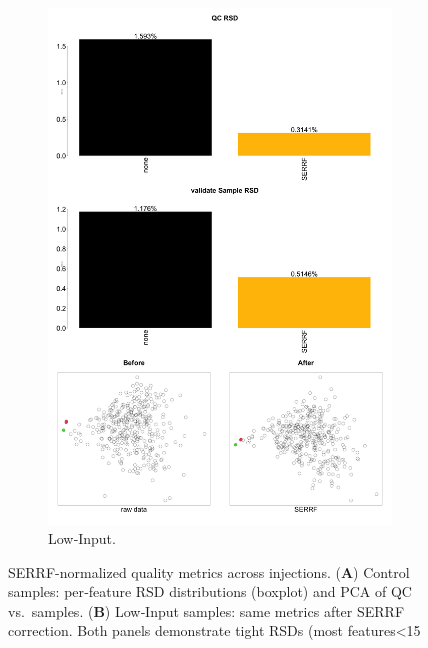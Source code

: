 \documentclass[10pt,letterpaper]{article}
\begin{document}
\begin{figure}[htp]
\begin{subfigure}[t]{0.48\textwidth}
    \includegraphics[width=\linewidth]{fig/supp/SuppFig_2B_RSD_PCA_Lowinput.png}
    \caption{Low‐Input.}
    \label{fig:S2B}
  \end{subfigure}

  \caption{
    SERRF-normalized quality metrics across injections.  
    (\textbf{A}) Control samples: per‐feature RSD distributions (boxplot) and PCA of QC vs.\ samples.  
    (\textbf{B}) Low‐Input samples: same metrics after SERRF correction.  
    Both panels demonstrate tight RSDs (most features<15 %
  }
  \label{fig:S2}
\end{figure}
\end{document}
